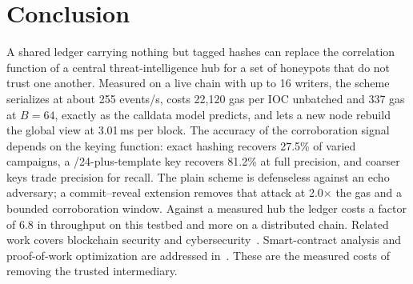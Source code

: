 \documentclass[conference]{IEEEtran}
\begin{document}
\section{Conclusion}
A shared ledger carrying nothing but tagged hashes can replace the correlation function of a central threat-intelligence hub for a set of honeypots that do not trust one another. Measured on a live chain with up to 16 writers, the scheme serializes at about 255 events/s, costs 22,120 gas per IOC unbatched and 337 gas at $B=64$, exactly as the calldata model predicts, and lets a new node rebuild the global view at 3.01\,ms per block. The accuracy of the corroboration signal depends on the keying function: exact hashing recovers 27.5\% of varied campaigns, a /24-plus-template key recovers 81.2\% at full precision, and coarser keys trade precision for recall. The plain scheme is defenseless against an echo adversary; a commit--reveal extension removes that attack at 2.0$\times$ the gas and a bounded corroboration window. Against a measured hub the ledger costs a factor of 6.8 in throughput on this testbed and more on a distributed chain. Related work covers blockchain security and cybersecurity~\cite{ref20,ref21}. Smart-contract analysis and proof-of-work optimization are addressed in~\cite{ref22,ref23}. These are the measured costs of removing the trusted intermediary.
\end{document}
